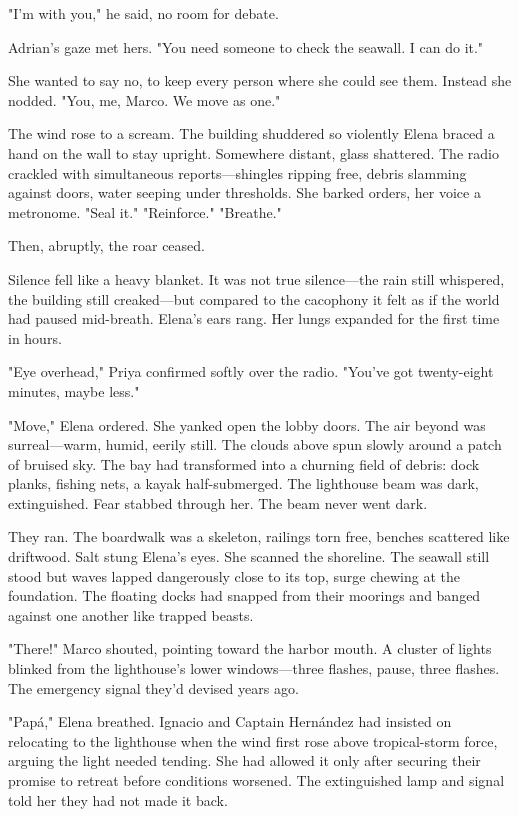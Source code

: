 "I'm with you," he said, no room for debate.

Adrian's gaze met hers. "You need someone to check the seawall. I can do it."

She wanted to say no, to keep every person where she could see them. Instead she nodded. "You, me, Marco. We move as one."

The wind rose to a scream. The building shuddered so violently Elena braced a hand on the wall to stay upright. Somewhere distant, glass shattered. The radio crackled with simultaneous reports—shingles ripping free, debris slamming against doors, water seeping under thresholds. She barked orders, her voice a metronome. "Seal it." "Reinforce." "Breathe."

Then, abruptly, the roar ceased.

Silence fell like a heavy blanket. It was not true silence—the rain still whispered, the building still creaked—but compared to the cacophony it felt as if the world had paused mid-breath. Elena's ears rang. Her lungs expanded for the first time in hours.

"Eye overhead," Priya confirmed softly over the radio. "You've got twenty-eight minutes, maybe less."

"Move," Elena ordered. She yanked open the lobby doors. The air beyond was surreal—warm, humid, eerily still. The clouds above spun slowly around a patch of bruised sky. The bay had transformed into a churning field of debris: dock planks, fishing nets, a kayak half-submerged. The lighthouse beam was dark, extinguished. Fear stabbed through her. The beam never went dark.

They ran. The boardwalk was a skeleton, railings torn free, benches scattered like driftwood. Salt stung Elena's eyes. She scanned the shoreline. The seawall still stood but waves lapped dangerously close to its top, surge chewing at the foundation. The floating docks had snapped from their moorings and banged against one another like trapped beasts.

"There!" Marco shouted, pointing toward the harbor mouth. A cluster of lights blinked from the lighthouse's lower windows—three flashes, pause, three flashes. The emergency signal they'd devised years ago.

"Papá," Elena breathed. Ignacio and Captain Hernández had insisted on relocating to the lighthouse when the wind first rose above tropical-storm force, arguing the light needed tending. She had allowed it only after securing their promise to retreat before conditions worsened. The extinguished lamp and signal told her they had not made it back.

